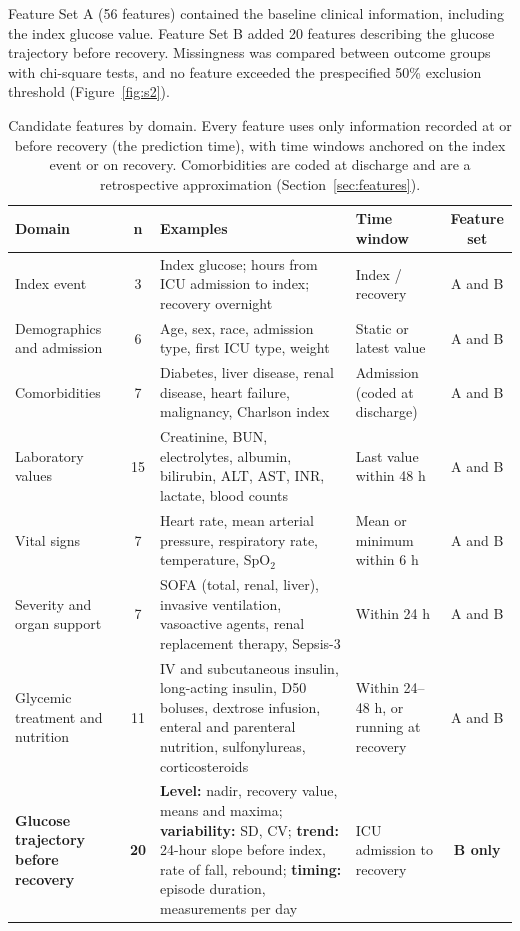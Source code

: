\documentclass[twocolumn, 8pt]{article}
\begin{document}
Feature Set A (56 features) contained the baseline clinical information, including the index glucose value. Feature Set B added 20 features describing the glucose trajectory before recovery. Missingness was compared between outcome groups with chi-square tests, and no feature exceeded the prespecified 50\% exclusion threshold (Figure~\ref{fig:s2}).

\begin{table}[!t]
\setlength{\abovecaptionskip}{5pt}
\caption{Candidate features by domain. Every feature uses only information recorded at or before recovery (the prediction time), with time windows anchored on the index event or on recovery. Comorbidities are coded at discharge and are a retrospective approximation (Section~\ref{sec:features}).}
\label{tab:features}
\centering
\small
\begin{tabularx}{\textwidth}{>{\raggedright\arraybackslash}p{3.3cm} c >{\raggedright\arraybackslash}X >{\raggedright\arraybackslash}p{3.1cm} c}
    \toprule
    \textbf{Domain} & \textbf{n} & \textbf{Examples} & \textbf{Time window} & \textbf{Feature set} \\
    \midrule
    Index event & 3 & Index glucose; hours from ICU admission to index; recovery overnight & Index / recovery & A and B \\
    Demographics and admission & 6 & Age, sex, race, admission type, first ICU type, weight & Static or latest value & A and B \\
    Comorbidities & 7 & Diabetes, liver disease, renal disease, heart failure, malignancy, Charlson index & Admission (coded at discharge) & A and B \\
    Laboratory values & 15 & Creatinine, BUN, electrolytes, albumin, bilirubin, ALT, AST, INR, lactate, blood counts & Last value within 48 h & A and B \\
    Vital signs & 7 & Heart rate, mean arterial pressure, respiratory rate, temperature, SpO$_2$ & Mean or minimum within 6 h & A and B \\
    Severity and organ support & 7 & SOFA (total, renal, liver), invasive ventilation, vasoactive agents, renal replacement therapy, Sepsis-3 & Within 24 h & A and B \\
    Glycemic treatment and nutrition & 11 & IV and subcutaneous insulin, long-acting insulin, D50 boluses, dextrose infusion, enteral and parenteral nutrition, sulfonylureas, corticosteroids & Within 24--48 h, or running at recovery & A and B \\
    \textbf{Glucose trajectory before recovery} & \textbf{20} & \textbf{Level:} nadir, recovery value, means and maxima; \textbf{variability:} SD, CV; \textbf{trend:} 24-hour slope before index, rate of fall, rebound; \textbf{timing:} episode duration, measurements per day & ICU admission to recovery & \textbf{B only} \\

\end{tabularx}
\end{table}
\end{document}
